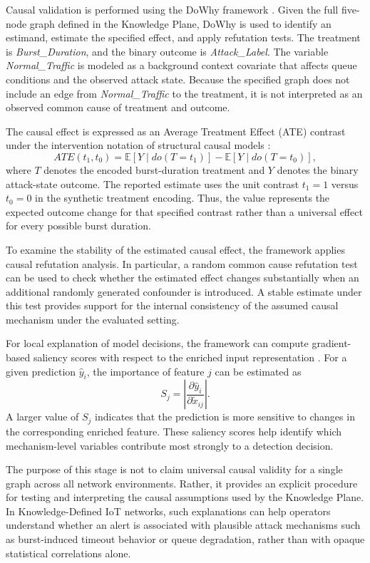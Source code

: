 \documentclass[journal]{IEEEtran}
\begin{document}
Causal validation is performed using the DoWhy framework
\cite{sharma2020dowhy}. Given the full five-node graph defined in the
Knowledge Plane, DoWhy is used to identify an estimand, estimate the specified
effect, and apply refutation tests. The treatment is
\textit{Burst\_Duration}, and the binary outcome is
\textit{Attack\_Label}. The variable \textit{Normal\_Traffic} is modeled as
a background context covariate that affects queue conditions and the observed
attack state. Because the specified graph does not include an edge from
\textit{Normal\_Traffic} to the treatment, it is not interpreted as an
observed common cause of treatment and outcome.

The causal effect is expressed as an Average Treatment Effect (ATE) contrast
under the intervention notation of structural causal models
\cite{pearl2009causality}:
\[
  ATE(t_1,t_0)
  = \mathbb{E}[Y \mid do(T=t_1)]
  - \mathbb{E}[Y \mid do(T=t_0)],
\]
where $T$ denotes the encoded burst-duration treatment and $Y$ denotes the
binary attack-state outcome. The reported estimate uses the unit contrast
$t_1=1$ versus $t_0=0$ in the synthetic treatment encoding. Thus, the value
represents the expected outcome change for that specified contrast rather
than a universal effect for every possible burst duration.

To examine the stability of the estimated causal effect, the framework applies causal refutation analysis. In particular, a random common cause refutation test can be used to check whether the estimated effect changes substantially when an additional randomly generated confounder is introduced. A stable estimate under this test provides support for the internal consistency of the assumed causal mechanism under the evaluated setting.

For local explanation of model decisions, the framework can compute gradient-based saliency scores with respect to the enriched input representation \cite{simonyan2014saliency}. For a given prediction $\hat{y}_i$, the importance of feature $j$ can be estimated as
\[
  S_j = \left| \frac{\partial \hat{y}_i}{\partial \tilde{x}_{ij}} \right|.
\]
A larger value of $S_j$ indicates that the prediction is more sensitive to changes in the corresponding enriched feature. These saliency scores help identify which mechanism-level variables contribute most strongly to a detection decision.

The purpose of this stage is not to claim universal causal validity for a single graph across all network environments. Rather, it provides an explicit procedure for testing and interpreting the causal assumptions used by the Knowledge Plane. In Knowledge-Defined IoT networks, such explanations can help operators understand whether an alert is associated with plausible attack mechanisms such as burst-induced timeout behavior or queue degradation, rather than with opaque statistical correlations alone.
\end{document}
